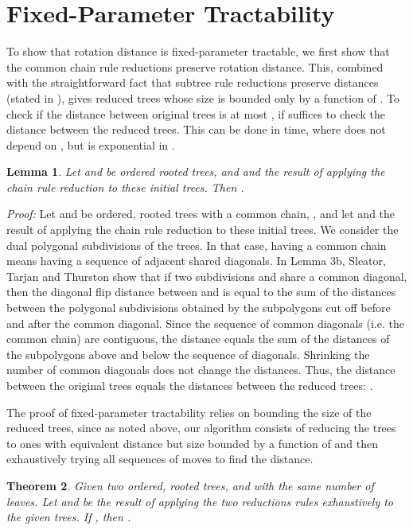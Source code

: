 \documentclass[12pt]{article}
\newtheorem{theorem}{Theorem}
\newtheorem{lemma}[theorem]{Lemma}
\begin{document}
\section{Fixed-Parameter Tractability}

To show that rotation distance is fixed-parameter 
tractable, we first show that the common chain rule reductions
preserve rotation distance.  
This, combined with the
straightforward fact that subtree rule reductions preserve
distances (stated in \cite{stt}), gives reduced trees whose size is bounded
only by a function of .   To check if the distance between
original trees is at most , if suffices to check the distance
between the reduced trees. This can be
done in  time, where  does not 
depend on , but is exponential in . 

\begin{lemma} 
\label{lemchain} Let  and  be ordered rooted
trees, and  and  the result of applying the chain
rule reduction to these initial trees.  Then
.
\end{lemma}

{\em Proof:}  
Let  and  be ordered, rooted trees with a common chain, 
, and let  and  the result of applying the chain
rule reduction to these initial trees.  
We consider the dual polygonal subdivisions of the trees.  In that case,
having a common chain means having a sequence of adjacent shared diagonals.
In Lemma 3b, Sleator, Tarjan and Thurston  \cite{stt} 
show that if two subdivisions  and  share a common diagonal, then 
the diagonal flip distance between  and  is equal to the sum 
of the distances between the polygonal subdivisions obtained by the subpolygons
cut off before and after the common diagonal.   
Since the sequence of common diagonals (i.e. the common chain) 
are contiguous, the distance equals the sum of the distances of the subpolygons
above and below the sequence of diagonals.  Shrinking the number
of common diagonals does not change the distances.  Thus, the 
distance between the original trees equals the distances between
the reduced trees:  .
\hfill 


The proof of fixed-parameter tractability relies on bounding the size of 
the reduced trees, since as noted above, our algorithm
consists of reducing the trees to ones with equivalent 
distance but size bounded by a function of  and then 
exhaustively trying all sequences of  moves
to find the distance.


\begin{theorem}
\label{lemdistsame}  Given two ordered, rooted trees,  and 
with the same number of leaves.  Let 
 and  be the result of applying the two 
reductions rules exhaustively to the given trees. 
If , then .
\end{theorem}
\end{document}
